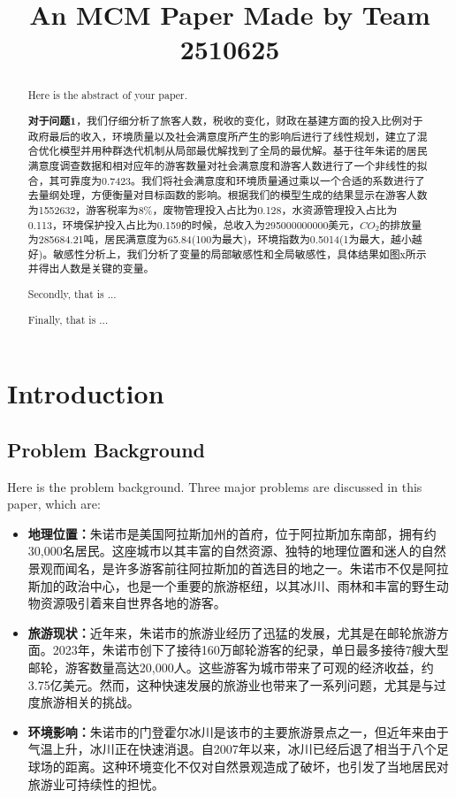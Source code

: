 \documentclass[12pt]{article}  %
\title{An MCM Paper Made by Team 2510625}  %
\begin{document}
\begin{abstract}
    Here is the abstract of your paper.

    \textbf{对于问题1}，我们仔细分析了旅客人数，税收的变化，财政在基建方面的投入比例对于政府最后的收入，环境质量以及社会满意度所产生的影响后进行了线性规划，建立了混合优化模型并用种群迭代机制从局部最优解找到了全局的最优解。基于往年朱诺的居民满意度调查数据和相对应年的游客数量对社会满意度和游客人数进行了一个非线性的拟合，其可靠度为0.7423。我们将社会满意度和环境质量通过乘以一个合适的系数进行了去量纲处理，方便衡量对目标函数的影响。根据我们的模型生成的结果显示在游客人数为1552632，游客税率为8\%，废物管理投入占比为0.128，水资源管理投入占比为0.113，环境保护投入占比为0.159的时候，总收入为295000000000美元，$CO_{2}$的排放量为285684.21吨，居民满意度为65.84(100为最大)，环境指数为0.5014(1为最大，越小越好)。敏感性分析上，我们分析了变量的局部敏感性和全局敏感性，具体结果如图x所示并得出人数是关键的变量。

    Secondly, that is ...

    Finally, that is ...


\end{abstract}

\maketitle  %
\tableofcontents  %


\section{Introduction}
\subsection{Problem Background}
Here is the problem background. Three major problems are discussed in this paper, which are:
\begin{itemize}
    \item \textbf{地理位置：}朱诺市是美国阿拉斯加州的首府，位于阿拉斯加东南部，拥有约30,000名居民。这座城市以其丰富的自然资源、独特的地理位置和迷人的自然景观而闻名，是许多游客前往阿拉斯加的首选目的地之一。朱诺市不仅是阿拉斯加的政治中心，也是一个重要的旅游枢纽，以其冰川、雨林和丰富的野生动物资源吸引着来自世界各地的游客。
    \item \textbf{旅游现状：}近年来，朱诺市的旅游业经历了迅猛的发展，尤其是在邮轮旅游方面。2023年，朱诺市创下了接待160万邮轮游客的纪录，单日最多接待7艘大型邮轮，游客数量高达20,000人。\cite{1}这些游客为城市带来了可观的经济收益，约3.75亿美元。\cite{2}然而，这种快速发展的旅游业也带来了一系列问题，尤其是与过度旅游相关的挑战。
    \item \textbf{环境影响：}朱诺市的门登霍尔冰川是该市的主要旅游景点之一，但近年来由于气温上升，冰川正在快速消退。自2007年以来，冰川已经后退了相当于八个足球场的距离。这种环境变化不仅对自然景观造成了破坏，也引发了当地居民对旅游业可持续性的担忧。\cite{3}
\end{itemize}
\end{document}
